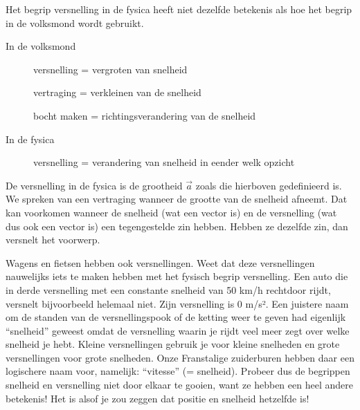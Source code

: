 \documentclass{ximera}
\begin{document}
\begin{remark}
	Het begrip versnelling in de fysica heeft niet dezelfde betekenis als hoe het begrip in de volksmond wordt gebruikt.
	\begin{description}
		\item[In de volksmond] 
			\begin{itemize}
				versnelling = vergroten van snelheid

				vertraging = verkleinen van de snelheid

				bocht maken = richtingsverandering van de snelheid
			\end{itemize}
		\item[In de fysica]
			versnelling = verandering van snelheid in eender welk opzicht
	\end{description}

	De versnelling in de fysica is de grootheid $\vec{a}$ zoals die hierboven gedefinieerd is. We spreken van een vertraging wanneer de grootte van de snelheid afneemt. Dat kan voorkomen wanneer de snelheid (wat een vector is) en de versnelling (wat dus ook een vector is) een tegengestelde zin hebben. Hebben ze dezelfde zin, dan versnelt het voorwerp.



\end{remark}

\begin{remark}

	Wagens en fietsen hebben ook versnellingen. 
	Weet dat deze versnellingen nauwelijks iets te maken hebben met het fysisch begrip versnelling. 
	Een auto die in derde versnelling met een constante snelheid van 50 km/h rechtdoor rijdt, versnelt bijvoorbeeld helemaal niet. 
	Zijn versnelling is 0 m/s². 
	Een juistere naam om de standen van de versnellingspook of de ketting weer te geven had eigenlijk “snelheid” geweest omdat de versnelling waarin je rijdt veel meer zegt over welke snelheid je hebt. 
	Kleine versnellingen gebruik je voor kleine snelheden en grote versnellingen voor grote snelheden. 
	Onze Franstalige zuiderburen hebben daar een logischere naam voor, namelijk: “vitesse” (= snelheid). 
	Probeer dus de begrippen snelheid en versnelling niet door elkaar te gooien, want ze hebben een heel andere betekenis! 
	Het is alsof je zou zeggen dat positie en snelheid hetzelfde is!


\end{remark}
\end{document}
